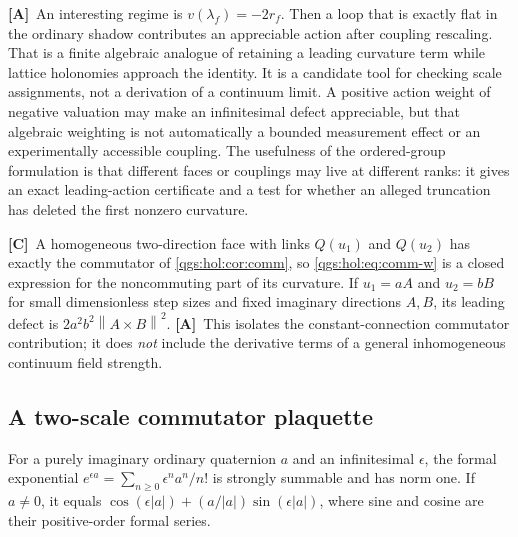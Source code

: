 \documentclass[11pt,oneside]{article}
\numberwithin{equation}{section}
\theoremstyle{plain}
\theoremstyle{definition}
\theoremstyle{remark}
\newcommand{\abs}[1]{\left|#1\right|}
\newcommand{\norm}[1]{\left\|#1\right\|}
\newcommand{\TC}{\textcolor{TierC}{\textsf{\bfseries[C]}}}
\newcommand{\TA}{\textcolor{TierA}{\textsf{\bfseries[A]}}}
\begin{document}
\TA\ An interesting regime is $v(\lambda_f)=-2r_f$. Then a loop that is exactly flat in the ordinary shadow contributes an appreciable action after coupling rescaling. That is a finite algebraic analogue of retaining a leading curvature term while lattice holonomies approach the identity. It is a candidate tool for checking scale assignments, not a derivation of a continuum limit. A positive action weight of negative valuation may make an infinitesimal defect appreciable, but that algebraic weighting is not automatically a bounded measurement effect or an experimentally accessible coupling. The usefulness of the ordered-group formulation is that different faces or couplings may live at different ranks: it gives an exact leading-action certificate and a test for whether an alleged truncation has deleted the first nonzero curvature.

\TC\ A homogeneous two-direction face with links $Q(u_1)$ and $Q(u_2)$ has exactly the commutator of \cref{qgs:hol:cor:comm}, so \eqref{qgs:hol:eq:comm-w} is a closed expression for the noncommuting part of its curvature. If $u_1=aA$ and $u_2=bB$ for small dimensionless step sizes and fixed imaginary directions $A,B$, its leading defect is $2a^2b^2\norm{A\times B}^2$. \TA\ This isolates the constant-connection commutator contribution; it does \emph{not} include the derivative terms of a general inhomogeneous continuum field strength.

\subsection{A two-scale commutator plaquette}
For a purely imaginary ordinary quaternion $a$ and an infinitesimal $\epsilon$, the formal exponential $e^{\epsilon a}=\sum_{n\ge0}\epsilon^n a^n/n!$ is strongly summable and has norm one. If $a\ne0$, it equals $\cos(\epsilon\abs a)+(a/\abs a)\sin(\epsilon\abs a)$, where sine and cosine are their positive-order formal series.
\end{document}
